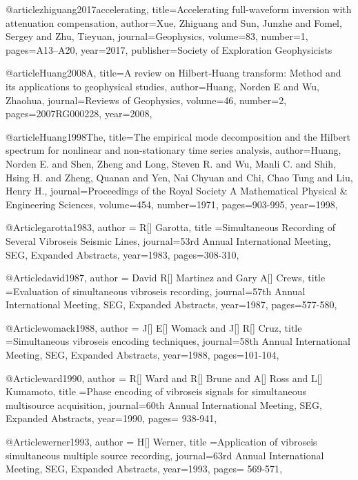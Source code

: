 @article{zhiguang2017accelerating,
  title={Accelerating full-waveform inversion with attenuation compensation},
  author={Xue, Zhiguang and Sun, Junzhe and Fomel, Sergey and Zhu, Tieyuan},
  journal={Geophysics},
  volume={83},
  number={1},
  pages={A13--A20},
  year={2017},
  publisher={Society of Exploration Geophysicists}
}

@article{Huang2008A,
  title={A review on {H}ilbert‐{H}uang transform: {M}ethod and its applications to geophysical studies},
  author={Huang, Norden E and Wu, Zhaohua},
  journal={Reviews of Geophysics},
  volume={46},
  number={2},
  pages={2007RG000228},
  year={2008},
}

@article{Huang1998The,
  title={The empirical mode decomposition and the Hilbert spectrum for nonlinear and non-stationary time series analysis},
  author={Huang, Norden E. and Shen, Zheng and Long, Steven R. and Wu, Manli C. and Shih, Hsing H. and Zheng, Quanan and Yen, Nai Chyuan and Chi, Chao Tung and Liu, Henry H.},
  journal={Proceedings of the Royal Society A Mathematical Physical \& Engineering Sciences},
  volume={454},
  number={1971},
  pages={903-995},
  year={1998},
}


@Article{garotta1983,
  author = {R[] Garotta},
  title ={Simultaneous Recording of Several Vibroseis Seismic Lines},
  journal={53rd Annual International Meeting, SEG, Expanded Abstracts},
  year=1983,
  pages={308-310},
}

@Article{david1987,
  author = {David R[] Martinez and Gary A[] Crews},
  title ={Evaluation of simultaneous vibroseis recording},
  journal={57th Annual International Meeting, SEG, Expanded Abstracts},
  year=1987,
  pages={577-580},
}

@Article{womack1988,
  author = {J[] E[] Womack and J[] R[] Cruz},
  title ={Simultaneous vibroseis encoding techniques},
  journal={58th Annual International Meeting, SEG, Expanded Abstracts},
  year=1988,
  pages={101-104},
}

@Article{ward1990,
  author = {R[] Ward and R[] Brune and A[] Ross and L[] Kumamoto},
  title ={Phase encoding of vibroseis signals for simultaneous multisource acquisition},
  journal={60th Annual International Meeting, SEG, Expanded Abstracts},
  year=1990,
  pages={ 938-941},
}

@Article{werner1993,
  author = {H[] Werner},
  title ={Application of vibroseis simultaneous multiple source recording},
  journal={63rd Annual International Meeting, SEG, Expanded Abstracts},
  year=1993,
  pages={ 569-571},
}

